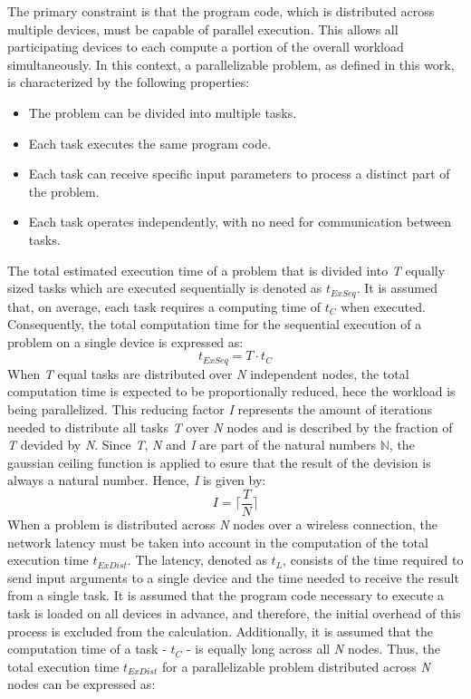 The primary constraint is that the program code, which is distributed across multiple devices, must be capable of parallel execution. This allows all participating devices to  each compute a portion of the overall workload simultaneously. In this context, a parallelizable problem, as defined in this work, is characterized by the following properties:
\begin{itemize}
  \item The problem can be divided into multiple tasks.
  \item Each task executes the same program code.
  \item Each task can receive specific input parameters to process a distinct part of the problem.
  \item Each task operates independently, with no need for communication between tasks.
\end{itemize}
The total estimated execution time of a problem that is divided into \emph{T} equally sized tasks which are executed sequentially is denoted as $t_{ExSeq}$. It is assumed that, on average, each task requires a computing time of $t_{C}$ when executed. Consequently, the total computation time for the sequential execution of a problem on a single device is expressed as:
\begin{equation}
  t_{ExSeq} = T \cdot t_{C}
  \label{equ:single}
\end{equation}
When \emph{T} equal tasks are distributed over \emph{N} independent nodes, the total computation time is expected to be proportionally reduced, hece the workload is being parallelized. This reducing factor \emph{I} represents the amount of iterations needed to distribute all tasks \emph{T} over \emph{N} nodes and is described by the fraction of \emph{T} devided by \emph{N}. Since \emph{T}, \emph{N} and \emph{I} are part of the natural numbers $\mathbb{N}$, the gaussian ceiling function is applied to esure that the result of the devision is always a natural number. Hence, \emph{I} is given by: 
\begin{equation}
  I = \bigg\lceil\frac{T}{N}\bigg\rceil
  \label{equ:frac}
\end{equation}
When a problem is distributed across \emph{N} nodes over a wireless connection, the network latency must be taken into account in the computation of the total execution time $t_{ExDist}$. The latency, denoted as $t_{L}$, consists of the time required to send input arguments to a single device and the time needed to receive the result from a single task. It is assumed that the program code necessary to execute a task is loaded on all devices in advance, and therefore, the initial overhead of this process is excluded from the calculation. Additionally, it is assumed that the computation time of a task - $t_{C}$ - is equally long across all \emph{N} nodes. Thus, the total execution time $t_{ExDist}$ for a parallelizable problem distributed across \emph{N} nodes can be expressed as: 
